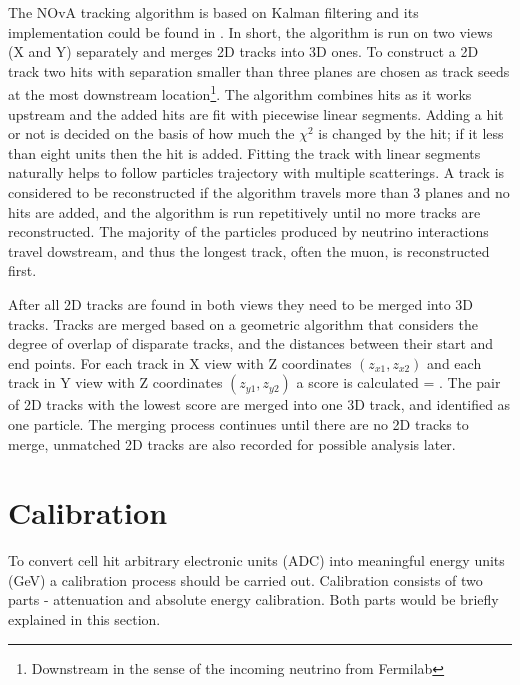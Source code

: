 The NOvA tracking algorithm is based on Kalman filtering \cite{Kalman} and its implementation could be found 
in \cite{Nick}. In short, the algorithm is run on two views (X and Y) separately and merges 2D tracks into
3D ones. To construct a 2D track two hits with separation smaller than three planes are chosen as track 
seeds at the most downstream location\footnote{Downstream in the sense of the incoming neutrino from Fermilab}. 
The algorithm combines hits as it works upstream and the added hits are fit with piecewise linear segments. 
Adding a hit or not 
is decided on the basis of how much the $\chi^2$ is changed by the hit; if it less than eight units 
then the hit is added. Fitting the track with linear segments naturally helps to follow particles trajectory 
with multiple scatterings. A track is considered to be reconstructed if the algorithm travels more than 3 planes
and no hits are added, and the algorithm is run repetitively until no more tracks are reconstructed. 
The majority of the particles produced by neutrino interactions travel dowstream, and thus the longest 
track, often the muon, is reconstructed first.

After all 2D tracks are found in both views they need to be merged into 3D tracks. Tracks are merged based on
a geometric algorithm that considers the degree of overlap of disparate tracks, and the distances between
their start and end points. For each track in X view with Z coordinates $(z_{x1}, z_{x2})$ and each track in 
Y view with Z coordinates $(z_{y1}, z_{y2})$ a score is calculated
\be
{} = .
\ee
The pair of 2D tracks with the lowest score are merged into one 3D track, and identified as one particle.
The merging process continues until there are no 2D tracks to merge, unmatched 2D tracks are also recorded
for possible analysis later.

\section{Calibration}
To convert cell hit arbitrary electronic units (ADC) into meaningful energy units (GeV) a calibration 
process should be carried out. Calibration consists of two parts - attenuation and absolute energy calibration. 
Both parts would be briefly explained in this section.


